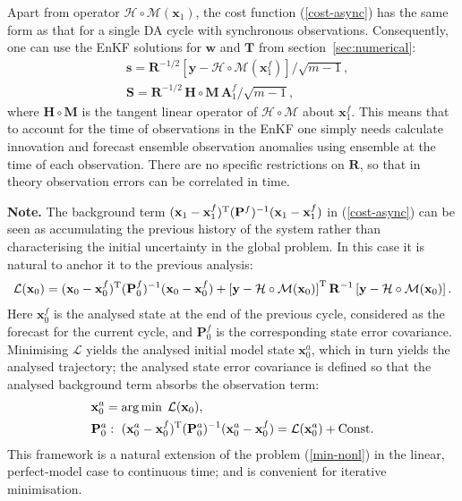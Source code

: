 \documentclass[11pt]{report}
\newcommand{\mb} {\mathbf}
\newcommand{\T}{^{\tiny \mathrm T}}
\begin{document}
Apart from operator $\mathcal H \circ \mathcal M (\mb x_1)$, the cost function (\ref{cost-async}) has the same form as that for a single DA cycle with synchronous observations.
Consequently, one can use the EnKF solutions for $\mb w$ and $\mb T$ from section~\ref{sec:numerical}:
\begin{align}
  \label{s-async}
  &\mb s = \mb R^{-1/2} \left[ \mb y - \mathcal H \circ \mathcal M (\mb x_1^f) \right] / \sqrt{m - 1},\\
  \label{S-async}
  &\mb S = \mb R^{-1/2} \, \mb H \circ \mb M \, \mb A_1^f / \sqrt{m - 1},
\end{align}
where $\mb H \circ \mb M$ is the tangent linear operator of $\mathcal H \circ \mathcal M$ about $\mb x_1^f$.
This means that to account for the time of observations in the EnKF one simply needs calculate innovation and forecast ensemble observation anomalies using ensemble at the time of each observation.
There are no specific restrictions on $\mb R$, so that in theory observation errors can be correlated in time.

{
  \setlength{\abovedisplayskip}{2pt}
  \setlength{\belowdisplayskip}{2pt}
  \scriptsize
  {\bf Note.} The background term $(\mb x_1 - \mb x_1^f)\T (\mb P^f)^{-1} (\mb x_1 - \mb x_1^f)$ in (\ref{cost-async}) can be seen as accumulating the previous history of the system rather than characterising the initial uncertainty in the global problem.
  In this case it is natural to anchor it to the previous analysis:
  \begin{align}
    \mathcal L(\mb x_0) = (\mb x_0 - \mb x_0^f)\T (\mb P_0^f)^{-1} (\mb x_0 - \mb x_0^f) + \left [ \mb y - \mathcal H \circ \mathcal M(\mb x_0) \right ] \T \mb R^{-1} \left [ \mb y - \mathcal H \circ \mathcal M(\mb x_0) \right ].
  \end{align}
  Here $\mb x_0^f$ is the analysed state at the end of the previous cycle, considered as the forecast for the current cycle, and $\mb P_0^f$ is the corresponding state error covariance.
  Minimising $\mathcal L$ yields the analysed initial model state $\mb x_0^a$, which in turn yields the analysed trajectory; the analysed state error covariance is defined so that the analysed background term absorbs the observation term:
  \begin{align*}
    &\mb x_0^a = \arg \min \; \mathcal L(\mb x_0),\\
    &\mb P_0^a: \ (\mb x_0^a - \mb x_0^f)\T (\mb P_0^a)^{-1} (\mb x_0^a - \mb x_0^f) = \mathcal L(\mb x_0^a) + \mathrm{Const}.
  \end{align*}
  This framework is a natural extension of the problem (\ref{min-nonl}) in the linear, perfect-model case to continuous time; and is convenient for iterative minimisation.
}
\end{document}
